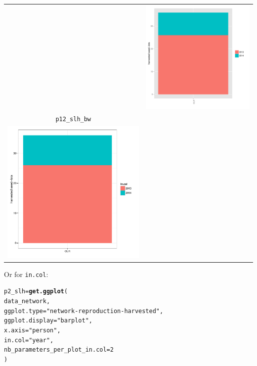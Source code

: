 \documentclass{article}\usepackage[]{graphicx}\usepackage[]{color}
\makeatletter
\newcommand{\hlnum}[1]{\textcolor[rgb]{0.686,0.059,0.569}{#1}}%
\newcommand{\hlstr}[1]{\textcolor[rgb]{0.192,0.494,0.8}{#1}}%
\newcommand{\hlstd}[1]{\textcolor[rgb]{0.345,0.345,0.345}{#1}}%
\newcommand{\hlkwb}[1]{\textcolor[rgb]{0.69,0.353,0.396}{#1}}%
\newcommand{\hlkwc}[1]{\textcolor[rgb]{0.333,0.667,0.333}{#1}}%
\newcommand{\hlkwd}[1]{\textcolor[rgb]{0.737,0.353,0.396}{\textbf{#1}}}%
\newenvironment{kframe}{%
 \def\at@end@of@kframe{}%
 \ifinner\ifhmode%
  \def\at@end@of@kframe{\end{minipage}}%
  \begin{minipage}{\columnwidth}%
 \fi\fi%
 \def\FrameCommand##1{\hskip\@totalleftmargin \hskip-\fboxsep
 \colorbox{shadecolor}{##1}\hskip-\fboxsep
     \hskip-\linewidth \hskip-\@totalleftmargin \hskip\columnwidth}%
 \MakeFramed {\advance\hsize-\width
   \@totalleftmargin\z@ \linewidth\hsize
   \@setminipage}}%
 {\par\unskip\endMakeFramed%
 \at@end@of@kframe}
\newenvironment{knitrout}{}{} %
\makeatother
\begin{document}
\begin{itemize}
\begin{center}
\begin{tabular}{cc}
\begin{knitrout}
{}



\end{knitrout}
&
\begin{knitrout}
\definecolor{shadecolor}{rgb}{0.969, 0.969, 0.969}\color{fgcolor}

{\centering \includegraphics[width=.4\textwidth]{figures/shinemas2R_unnamed-chunk-42-1} 

}



\end{knitrout}
\\
\texttt{p12\_slh\_bw} &  \\
\begin{knitrout}
\definecolor{shadecolor}{rgb}{0.969, 0.969, 0.969}\color{fgcolor}

{\centering \includegraphics[width=.4\textwidth]{figures/shinemas2R_unnamed-chunk-43-1} 

}



\end{knitrout}
&
\\
\end{tabular}
\end{center}


Or for \texttt{in.col}:
\begin{knitrout}
\color{fgcolor}\begin{kframe}
\begin{alltt}
\hlstd{p2_slh} \hlkwb{=} \hlkwd{get.ggplot}\hlstd{(}
        \hlstd{data_network,}
        \hlkwc{ggplot.type} \hlstd{=} \hlstr{"network-reproduction-harvested"}\hlstd{,}
        \hlkwc{ggplot.display} \hlstd{=} \hlstr{"barplot"}\hlstd{,}
        \hlkwc{x.axis} \hlstd{=} \hlstr{"person"}\hlstd{,}
        \hlkwc{in.col} \hlstd{=} \hlstr{"year"}\hlstd{,}
        \hlkwc{nb_parameters_per_plot_in.col} \hlstd{=} \hlnum{2}
        \hlstd{)}


\end{alltt}
\end{kframe}
\end{knitrout}
\end{itemize}
\end{document}
